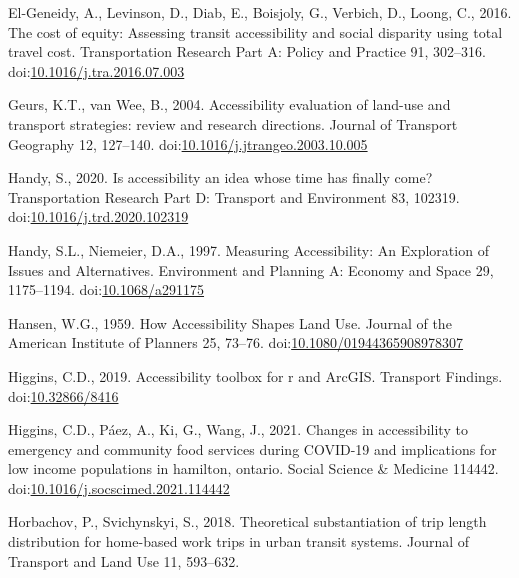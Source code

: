 \documentclass[]{elsarticle} %
\newlength{\cslhangindent}
\newlength{\cslentryspacingunit} %
\newenvironment{CSLReferences}[2] %
 {%
  \setlength{\parindent}{0pt}
  \ifodd #1
  \let\oldpar\par
  \def\par{\hangindent=\cslhangindent\oldpar}
  \fi
  \setlength{\parskip}{#2\cslentryspacingunit}
 }%
 {}
\begin{document}
\begin{CSLReferences}{1}{0}
\leavevmode{}%
El-Geneidy, A., Levinson, D., Diab, E., Boisjoly, G., Verbich, D.,
Loong, C., 2016. The cost of equity: {Assessing} transit accessibility
and social disparity using total travel cost. Transportation Research
Part A: Policy and Practice 91, 302--316.
doi:\href{https://doi.org/10.1016/j.tra.2016.07.003}{10.1016/j.tra.2016.07.003}

\leavevmode{}%
Geurs, K.T., van Wee, B., 2004. Accessibility evaluation of land-use and
transport strategies: review and research directions. Journal of
Transport Geography 12, 127--140.
doi:\href{https://doi.org/10.1016/j.jtrangeo.2003.10.005}{10.1016/j.jtrangeo.2003.10.005}

\leavevmode{}%
Handy, S., 2020. Is accessibility an idea whose time has finally come?
Transportation Research Part D: Transport and Environment 83, 102319.
doi:\href{https://doi.org/10.1016/j.trd.2020.102319}{10.1016/j.trd.2020.102319}

\leavevmode{}%
Handy, S.L., Niemeier, D.A., 1997. Measuring {Accessibility}: {An}
{Exploration} of {Issues} and {Alternatives}. Environment and Planning
A: Economy and Space 29, 1175--1194.
doi:\href{https://doi.org/10.1068/a291175}{10.1068/a291175}

\leavevmode{}%
Hansen, W.G., 1959. How Accessibility Shapes Land Use. Journal of the
American Institute of Planners 25, 73--76.
doi:\href{https://doi.org/10.1080/01944365908978307}{10.1080/01944365908978307}

\leavevmode{}%
Higgins, C.D., 2019. Accessibility toolbox for r and ArcGIS. Transport
Findings. doi:\href{https://doi.org/10.32866/8416}{10.32866/8416}

\leavevmode{}%
Higgins, C.D., Páez, A., Ki, G., Wang, J., 2021. Changes in
accessibility to emergency and community food services during COVID-19
and implications for low income populations in hamilton, ontario. Social
Science \& Medicine 114442.
doi:\href{https://doi.org/10.1016/j.socscimed.2021.114442}{10.1016/j.socscimed.2021.114442}

\leavevmode{}%
Horbachov, P., Svichynskyi, S., 2018. Theoretical substantiation of trip
length distribution for home-based work trips in urban transit systems.
Journal of Transport and Land Use 11, 593--632.


\end{CSLReferences}
\end{document}
